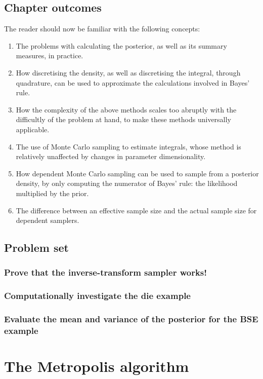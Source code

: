 \documentclass[11pt,fullpage]{book}
\begin{document}
\section{Chapter outcomes}
The reader should now be familiar with the following concepts:

\begin{enumerate}
\item The problems with calculating the posterior, as well as its summary measures, in practice.
\item How discretising the density, as well as discretising the integral, through quadrature, can be used to approximate the calculations involved in Bayes' rule. 
\item How the complexity of the above methods scales too abruptly with the difficultly of the problem at hand, to make these methods universally applicable.
\item The use of Monte Carlo sampling to estimate integrals, whose method is relatively unaffected by changes in parameter dimensionality.
\item How dependent Monte Carlo sampling can be used to sample from a posterior density, by only computing the numerator of Bayes' rule: the likelihood multiplied by the prior.
\item The difference between an effective sample size and the actual sample size for dependent samplers.
\end{enumerate}

\section{Problem set}
\subsection{Prove that the inverse-transform sampler works!}\label{prob:MCMC_inverseSamplerProof}
\subsection{Computationally investigate the die example}
\subsection{Evaluate the mean and variance of the posterior for the BSE example}\label{sec:MCMC_problemBSE}

\chapter{The Metropolis algorithm}\label{chap:metropolisHastings}
\end{document}
